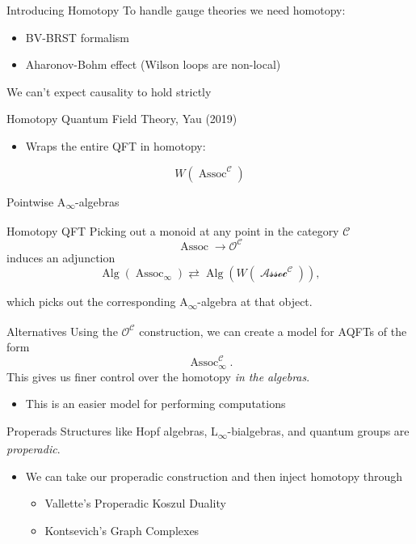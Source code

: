 \documentclass[presentation]{beamer}
\begin{document}
\begin{frame}[label={sec:orga817759}]{Introducing Homotopy}
To handle gauge theories we need homotopy:
\begin{itemize}
\item BV-BRST formalism
\item Aharonov-Bohm effect (Wilson loops are non-local)
\end{itemize}

\bigskip

We can't expect causality to hold strictly

\bigskip
\begin{block}{Homotopy Quantum Field Theory, Yau (2019)}
\medskip

\begin{itemize}
\item Wraps the entire QFT in homotopy:
\end{itemize}

\[
W(\operatorname{Assoc}^{\mathcal{C}})
\]
\end{block}
\end{frame}
\begin{frame}[label={sec:org678e101}]{Pointwise A\textsubscript{\(\infty\)}-algebras}
\begin{block}{Homotopy QFT}
Picking out a monoid at any point in the category \(\mathcal{C}\)
\[
\operatorname{Assoc} \to \mathcal{O}^{\mathcal{C}}
\]
induces an adjunction
\[
\operatorname{Alg}(\operatorname{Assoc}_{\infty}) \rightleftarrows \operatorname{Alg}(W(\mathcal{\operatorname{Assoc}}^{\mathcal{C}})),
\]

\bigskip 

which picks out the corresponding A\textsubscript{\(\infty\)}-algebra at that object.
\end{block}
\end{frame}
\begin{frame}[label={sec:orgda889de}]{Alternatives}
Using the \(\mathcal{O}^{\mathcal{C}}\) construction, we can create a model for AQFTs of the form
\[
\operatorname{Assoc}_{\infty}^{{\mathcal{C}}}.
\]
This gives us finer control over the homotopy \emph{in the algebras}.

\begin{itemize}
\item This is an easier model for performing computations
\end{itemize}

\bigskip
\begin{block}{Properads}
Structures like Hopf algebras, L\textsubscript{\(\infty\)}-bialgebras, and quantum groups are \emph{properadic}.
\begin{itemize}
\item We can take our properadic construction and then inject homotopy through
\begin{itemize}
\item Vallette's Properadic Koszul Duality
\item Kontsevich's Graph Complexes
\end{itemize}
\end{itemize}
\end{block}
\end{frame}
\end{document}
